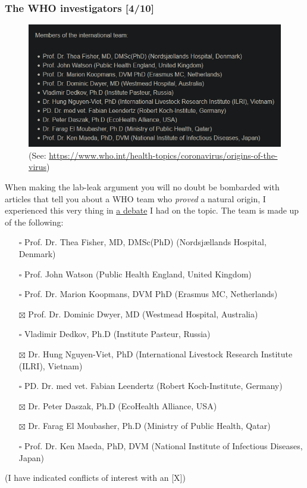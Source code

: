 \documentclass[11pt]{article}
\begin{document}
\subsubsection{The WHO investigators [4/10]}
\label{sec:org891e63b}
\begin{figure}[htbp]
\centering
\includegraphics[width=.9\linewidth]{./images/who-team.png}
\caption{(See: \url{https://www.who.int/health-topics/coronavirus/origins-of-the-virus})}
\end{figure}

When making the lab-leak argument you will no doubt be bombarded with articles that tell you about a WHO team who \emph{proved} a natural origin, I experienced this very thing in \href{https://www.youtube.com/watch?v=Lz4-QRh14Xs\&t=298s}{a debate} I had on the topic. The team is made up of the following:
\begin{itemize}
\item[{$\square$}] Prof. Dr. Thea Fisher, MD, DMSc(PhD) (Nordsjællands Hospital, Denmark)
\item[{$\square$}] Prof. John Watson (Public Health England, United Kingdom)
\item[{$\square$}] Prof. Dr. Marion Koopmans, DVM PhD (Erasmus MC, Netherlands)
\item[{$\boxtimes$}] Prof. Dr. Dominic Dwyer, MD (Westmead Hospital, Australia)
\item[{$\square$}] Vladimir Dedkov, Ph.D (Institute Pasteur, Russia)
\item[{$\boxtimes$}] Dr. Hung Nguyen-Viet, PhD (International Livestock Research Institute (ILRI), Vietnam)
\item[{$\square$}] PD. Dr. med vet. Fabian Leendertz (Robert Koch-Institute, Germany)
\item[{$\boxtimes$}] Dr. Peter Daszak, Ph.D (EcoHealth Alliance, USA)
\item[{$\boxtimes$}] Dr. Farag El Moubasher, Ph.D (Ministry of Public Health, Qatar)
\item[{$\square$}] Prof. Dr. Ken Maeda, PhD, DVM (National Institute of Infectious Diseases, Japan)
\end{itemize}
(I have indicated conflicts of interest with an [X])
\end{document}
